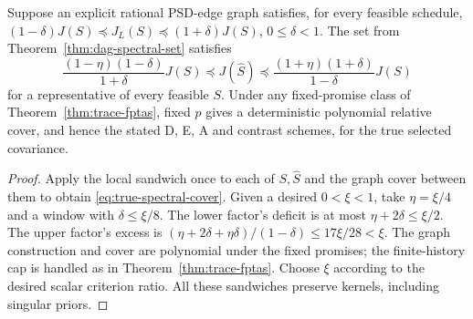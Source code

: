 \begin{corollary}
\label{cor:true-spectral-cover}
Suppose an explicit rational PSD-edge graph satisfies, for every feasible
schedule, $(1-\delta)J(S)\preceq J_L(S)\preceq(1+\delta)J(S)$,
$0\le\delta<1$. The set from Theorem~\ref{thm:dag-spectral-set} satisfies
\begin{equation}
 \frac{(1-\eta)(1-\delta)}{1+\delta}J(S)
 \preceq J(\widehat S)\preceq
 \frac{(1+\eta)(1+\delta)}{1-\delta}J(S)
 \label{eq:true-spectral-cover}
\end{equation}
for a representative of every feasible $S$. Under any fixed-promise class
of Theorem~\ref{thm:trace-fptas}, fixed $p$ gives a deterministic polynomial
relative cover, and hence the stated D, E, A and contrast schemes, for the
true selected covariance.
\end{corollary}
\begin{proof}
Apply the local sandwich once to each of $S,\widehat S$ and the graph
cover between them to obtain \eqref{eq:true-spectral-cover}. Given a desired
$0<\xi<1$, take $\eta=\xi/4$ and a window with $\delta\le\xi/8$.
The lower factor's deficit is at most $\eta+2\delta\le\xi/2$. The upper
factor's excess is $(\eta+2\delta+\eta\delta)/(1-\delta)\le17\xi/28<\xi$.
The graph construction and cover are polynomial under the fixed promises;
the finite-history cap is handled as in Theorem~\ref{thm:trace-fptas}.
Choose $\xi$ according to the desired scalar criterion ratio. All these
sandwiches preserve kernels, including singular priors.
\end{proof}

